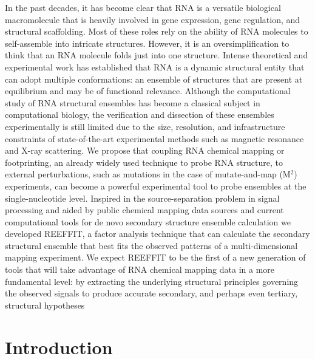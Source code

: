 \documentclass[12pt]{article}
\begin{document}
In the past decades, it has become clear that RNA is a versatile biological macromolecule that is heavily involved in gene expression, gene regulation, and structural scaffolding. Most of these roles rely on the ability of RNA molecules to self-assemble into intricate structures.
However, it is an oversimplification to think that an RNA molecule folds just into one structure. 
Intense theoretical and experimental work has established that RNA is a dynamic structural entity that can adopt multiple conformations: an ensemble of structures that are present at equilibrium and may be of functional relevance. 
Although the computational study of RNA structural ensembles has become a classical subject in computational biology, the verification and dissection of these ensembles experimentally is still limited due to the size, resolution, and infrastructure constraints of state-of-the-art experimental methods such as magnetic resonance and X-ray scattering. 
We propose that coupling RNA chemical mapping or footprinting, an already widely used technique to probe RNA structure, to external perturbations, such as mutations in the case of mutate-and-map (M$^2$) experiments, can become a powerful experimental tool to probe ensembles at the single-nucleotide level. 
Inspired in the source-separation problem in signal processing and aided by public chemical mapping data sources and current computational tools for de novo secondary structure ensemble calculation we developed REEFFIT, a factor analysis technique that can calculate the secondary structural ensemble that best fits the observed patterns of a multi-dimensional mapping experiment. 
We expect REEFFIT to be the first of a new generation of tools that will take advantage of RNA chemical mapping data in a more fundamental level: by extracting the underlying structural principles governing the observed signals to produce accurate secondary, and perhaps even tertiary, structural hypotheses


\section{Introduction}
\end{document}
